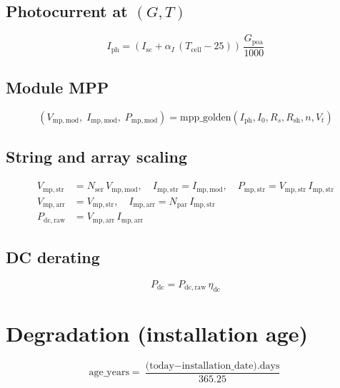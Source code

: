 \documentclass[11pt,a4paper]{article}
\begin{document}
\subsection{Photocurrent at \((G,T)\)}
\begin{equation}
  \boxed{
  I_{\mathrm{ph}} = \left(I_{\mathrm{sc}} + \alpha_I\,(T_{\mathrm{cell}} - 25)\right)\,\frac{G_{\mathrm{poa}}}{1000}
  }
\end{equation}

\subsection{Module MPP}
\begin{equation}
  (V_{\mathrm{mp,mod}},\; I_{\mathrm{mp,mod}},\; P_{\mathrm{mp,mod}}) = \text{mpp\_golden}(I_{\mathrm{ph}}, I_0, R_s, R_{\mathrm{sh}}, n, V_t)
\end{equation}

\subsection{String and array scaling}
\begin{align}
  V_{\mathrm{mp,str}} &= N_{\mathrm{ser}}\,V_{\mathrm{mp,mod}}, \quad
  I_{\mathrm{mp,str}} = I_{\mathrm{mp,mod}}, \quad
  P_{\mathrm{mp,str}} = V_{\mathrm{mp,str}}\,I_{\mathrm{mp,str}} \\
  V_{\mathrm{mp,arr}} &= V_{\mathrm{mp,str}}, \quad
  I_{\mathrm{mp,arr}} = N_{\mathrm{par}}\,I_{\mathrm{mp,str}} \\
  P_{\mathrm{dc,raw}} &= V_{\mathrm{mp,arr}}\,I_{\mathrm{mp,arr}}
\end{align}

\subsection{DC derating}
\begin{equation}
  \boxed{
  P_{\mathrm{dc}} = P_{\mathrm{dc,raw}}\,\eta_{\mathrm{dc}}
  }
\end{equation}

\section{Degradation (installation age)}

\begin{equation}
  \text{age\_years} = \frac{\text{(today} - \text{installation\_date).days}}{365.25}
\end{equation}
\end{document}
